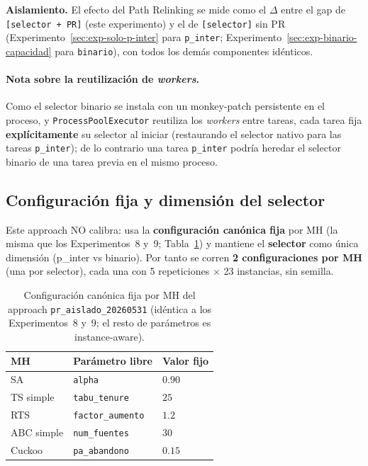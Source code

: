 \noindent\textbf{Aislamiento.} El efecto del Path Relinking se mide como el
$\Delta$ entre el gap de \texttt{[selector + PR]} (este experimento) y el de
\texttt{[selector]} sin PR (Experimento~\ref{sec:exp-solo-p-inter} para
\texttt{p\_inter}; Experimento~\ref{sec:exp-binario-capacidad} para
\texttt{binario}), con todos los demás componentes idénticos.

\paragraph{Nota sobre la reutilización de \emph{workers}.}
Como el selector binario se instala con un monkey-patch persistente en el
proceso, y \texttt{ProcessPoolExecutor} reutiliza los \emph{workers} entre
tareas, cada tarea fija \textbf{explícitamente} su selector al iniciar
(restaurando el selector nativo para las tareas \texttt{p\_inter}); de lo
contrario una tarea \texttt{p\_inter} podría heredar el selector binario de una
tarea previa en el mismo proceso.

\subsection{Configuración fija y dimensión del selector}

Este approach NO calibra: usa la \textbf{configuración canónica fija} por MH
(la misma que los Experimentos~8 y~9; Tabla~\ref{tab:grid-pr-aislado}) y
mantiene el \textbf{selector} como única dimensión (p\_inter vs binario). Por
tanto se corren \textbf{2 configuraciones por MH} (una por selector), cada una
con 5 repeticiones $\times$ 23 instancias, sin semilla.

\begin{table}[h]
\centering
\caption{Configuración canónica fija por MH del approach
         \texttt{pr\_aislado\_20260531} (idéntica a los Experimentos~8 y~9;
         el resto de parámetros es instance-aware).}
\label{tab:grid-pr-aislado}
\small
\begin{tabular}{lll}
\toprule
MH & Parámetro libre & Valor fijo \\
\midrule
SA            & \texttt{alpha}          & $0.90$ \\
TS simple     & \texttt{tabu\_tenure}   & $25$ \\
RTS           & \texttt{factor\_aumento}& $1.2$ \\
ABC simple    & \texttt{num\_fuentes}   & $30$ \\
Cuckoo        & \texttt{pa\_abandono}   & $0.15$ \\
\bottomrule
\end{tabular}
\end{table}

